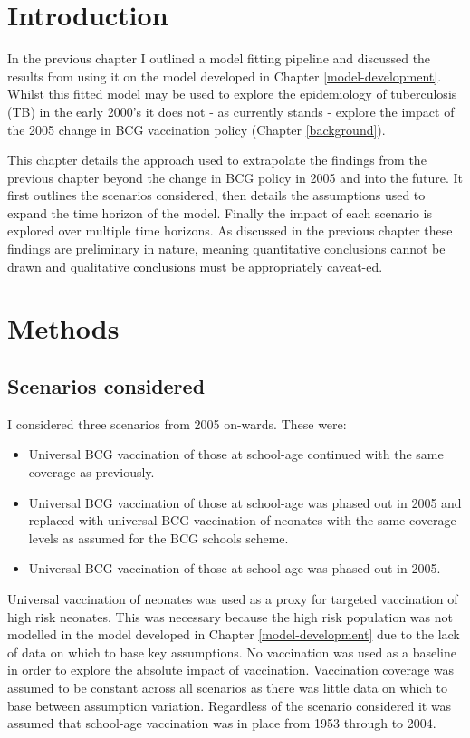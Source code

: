 \documentclass[11pt,twoside]{bristolthesis}
\providecommand{\tightlist}{%
  \setlength{\itemsep}{0pt}\setlength{\parskip}{0pt}}
\begin{document}
  \hypertarget{introduction-9}{%
  \section{Introduction}\label{introduction-9}}
  
  In the previous chapter I outlined a model fitting pipeline and discussed the results from using it on the model developed in Chapter \ref{model-development}. Whilst this fitted model may be used to explore the epidemiology of tuberculosis (TB) in the early 2000's it does not - as currently stands - explore the impact of the 2005 change in BCG vaccination policy (Chapter \ref{background}).
  
  This chapter details the approach used to extrapolate the findings from the previous chapter beyond the change in BCG policy in 2005 and into the future. It first outlines the scenarios considered, then details the assumptions used to expand the time horizon of the model. Finally the impact of each scenario is explored over multiple time horizons. As discussed in the previous chapter these findings are preliminary in nature, meaning quantitative conclusions cannot be drawn and qualitative conclusions must be appropriately caveat-ed.
  
  \hypertarget{methods-2}{%
  \section{Methods}\label{methods-2}}
  
  \hypertarget{scenarios-considered}{%
  \subsection{Scenarios considered}\label{scenarios-considered}}
  
  I considered three scenarios from 2005 on-wards. These were:
  \begin{itemize}
  \tightlist
  \item
    Universal BCG vaccination of those at school-age continued with the same coverage as previously.
  \item
    Universal BCG vaccination of those at school-age was phased out in 2005 and replaced with universal BCG vaccination of neonates with the same coverage levels as assumed for the BCG schools scheme.
  \item
    Universal BCG vaccination of those at school-age was phased out in 2005.
  \end{itemize}
  Universal vaccination of neonates was used as a proxy for targeted vaccination of high risk neonates. This was necessary because the high risk population was not modelled in the model developed in Chapter \ref{model-development} due to the lack of data on which to base key assumptions. No vaccination was used as a baseline in order to explore the absolute impact of vaccination. Vaccination coverage was assumed to be constant across all scenarios as there was little data on which to base between assumption variation. Regardless of the scenario considered it was assumed that school-age vaccination was in place from 1953 through to 2004.
  
\end{document}

